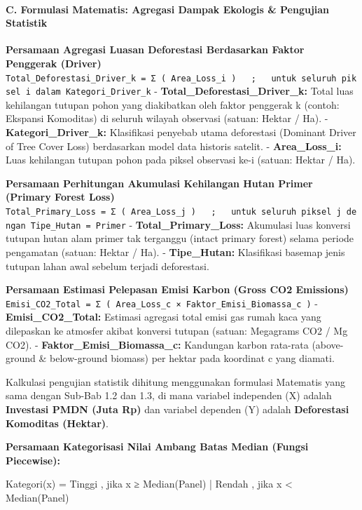 \documentclass[
]{article}
\newenvironment{Shaded}{}{}
\newcommand{\NormalTok}[1]{#1}
\begin{document}
\paragraph{C. Formulasi Matematis: Agregasi Dampak Ekologis \& Pengujian
Statistik}\label{c.-formulasi-matematis-agregasi-dampak-ekologis-pengujian-statistik}

\textbf{Persamaan Agregasi Luasan Deforestasi Berdasarkan Faktor
Penggerak (Driver)}
\texttt{Total\_Deforestasi\_Driver\_k\ =\ Σ\ (\ Area\_Loss\_i\ )\ \ \ ;\ \ \ untuk\ seluruh\ piksel\ i\ dalam\ Kategori\_Driver\_k}
- \textbf{Total\_Deforestasi\_Driver\_k:} Total luas kehilangan tutupan
pohon yang diakibatkan oleh faktor penggerak k (contoh: Ekspansi
Komoditas) di seluruh wilayah observasi (satuan: Hektar / Ha). -
\textbf{Kategori\_Driver\_k:} Klasifikasi penyebab utama deforestasi
(Dominant Driver of Tree Cover Loss) berdasarkan model data historis
satelit. - \textbf{Area\_Loss\_i:} Luas kehilangan tutupan pohon pada
piksel observasi ke-i (satuan: Hektar / Ha).

\textbf{Persamaan Perhitungan Akumulasi Kehilangan Hutan Primer (Primary
Forest Loss)}
\texttt{Total\_Primary\_Loss\ =\ Σ\ (\ Area\_Loss\_j\ )\ \ \ ;\ \ \ untuk\ seluruh\ piksel\ j\ dengan\ Tipe\_Hutan\ =\ \textquotesingle{}Primer\textquotesingle{}}
- \textbf{Total\_Primary\_Loss:} Akumulasi luas konversi tutupan hutan
alam primer tak terganggu (intact primary forest) selama periode
pengamatan (satuan: Hektar / Ha). - \textbf{Tipe\_Hutan:} Klasifikasi
basemap jenis tutupan lahan awal sebelum terjadi deforestasi.

\textbf{Persamaan Estimasi Pelepasan Emisi Karbon (Gross CO2 Emissions)}
\texttt{Emisi\_CO2\_Total\ =\ Σ\ (\ Area\_Loss\_c\ ×\ Faktor\_Emisi\_Biomassa\_c\ )}
- \textbf{Emisi\_CO2\_Total:} Estimasi agregasi total emisi gas rumah
kaca yang dilepaskan ke atmosfer akibat konversi tutupan (satuan:
Megagrams CO2 / Mg CO2). - \textbf{Faktor\_Emisi\_Biomassa\_c:}
Kandungan karbon rata-rata (above-ground \& below-ground biomass) per
hektar pada koordinat c yang diamati.

Kalkulasi pengujian statistik dihitung menggunakan formulasi Matematis
yang sama dengan Sub-Bab 1.2 dan 1.3, di mana variabel independen (X)
adalah \textbf{Investasi PMDN (Juta Rp)} dan variabel dependen (Y)
adalah \textbf{Deforestasi Komoditas (Hektar)}.

\textbf{Persamaan Kategorisasi Nilai Ambang Batas Median (Fungsi
Piecewise):}

\begin{Shaded}
\begin{Highlighting}[]
\NormalTok{Kategori(x) = \textquotesingle{}Tinggi\textquotesingle{} , jika x ≥ Median(Panel)   |   \textquotesingle{}Rendah\textquotesingle{} , jika x \textless{} Median(Panel)}
\end{Highlighting}
\end{Shaded}
\end{document}
